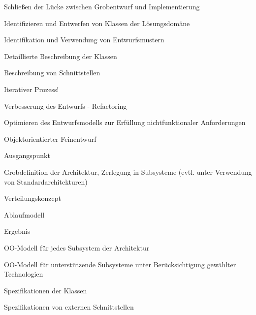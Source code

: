 \documentclass[a4paper]{article}
\begin{document}
\begin{multicols}{3}
  Schließen der Lücke zwischen Grobentwurf und Implementierung
  \begin{itemize*}
    \item Identifizieren und Entwerfen von Klassen der Lösungsdomäne
    \item Identifikation und Verwendung von Entwurfsmustern
    \item Detaillierte Beschreibung der Klassen
    \item Beschreibung von Schnittstellen
    \item Iterativer Prozess!
          \begin{itemize*}
            \item Verbesserung des Entwurfs - Refactoring
            \item Optimieren des Entwurfsmodells zur Erfüllung nichtfunktionaler Anforderungen
          \end{itemize*}
  \end{itemize*}

  Objektorientierter Feinentwurf
  \begin{itemize*}
    \item Ausgangspunkt
          \begin{itemize*}
            \item Grobdefinition der Architektur, Zerlegung in Subsysteme (evtl. unter Verwendung von Standardarchitekturen)
            \item Verteilungskonzept
            \item Ablaufmodell
          \end{itemize*}
    \item Ergebnis
          \begin{itemize*}
            \item OO-Modell für jedes Subsystem der Architektur
            \item OO-Modell für unterstützende Subsysteme unter Berücksichtigung gewählter Technologien
            \item Spezifikationen der Klassen
            \item Spezifikationen von externen Schnittstellen
          \end{itemize*}
  \end{itemize*}


\end{multicols}
\end{document}
